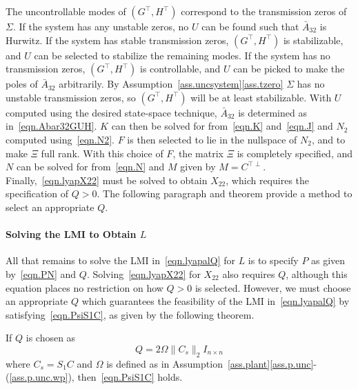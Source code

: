\documentclass[]{../sty/aiaa-tc}
\begin{document}
  The uncontrollable modes of $(G^{\top},H^{\top})$ correspond to the transmission zeros of $\Sigma$\cite{kouvaritakis.part2.1976}.
  If the system has any unstable zeros, no $U$ can be found such that $\bar{A}_{32}$ is Hurwitz.
  If the system has stable transmission zeros, $(G^{\top},H^{\top})$ is stabilizable, and $U$ can be selected to stabilize the remaining modes.
  If the system has no transmission zeros, $(G^{\top},H^{\top})$ is controllable, and $U$ can be picked to make the poles of $\bar{A}_{32}$ arbitrarily.
  By Assumption~\ref{ass.uncsystem}\ref{ass.tzero} $\Sigma$ has no unstable transmission zeros, so $(G^{\top},H^{\top})$ will be at least stabilizable.
  With $U$ computed using the desired state-space technique, $\bar{A}_{32}$ is determined as in\ \eqref{eqn.Abar32GUH}.
  $K$ can then be solved for from\ \eqref{eqn.K} and\ \eqref{eqn.J} and $N_{2}$ computed using\ \eqref{eqn.N2}.
  $F$ is then selected to lie in the nullspace of $N_{2}$, and to make $\Xi$ full rank.
  With this choice of $F$, the matrix $\Xi$ is completely specified, and $N$ can be solved for from\ \eqref{eqn.N} and $M$ given by $M=C^{\top\perp}$.
  Finally,\ \eqref{eqn.lyapX22} must be solved to obtain $X_{22}$, which requires the specification of $Q>0$.
  The following paragraph and theorem provide a method to select an appropriate $Q$.

  \paragraph{Solving the LMI to Obtain $L$}

  All that remains to solve the LMI in\ \eqref{eqn.lyapalQ} for $L$ is to specify $P$ as given by\ \eqref{eqn.PN} and $Q$.
  Solving\ \eqref{eqn.lyapX22} for $X_{22}$ also requires $Q$, although this equation places no restriction on how $Q>0$ is selected.
  However, we must choose an appropriate $Q$ which guarantees the feasibility of the LMI in\ \eqref{eqn.lyapalQ} by satisfying\ \eqref{eqn.PsiS1C}, as given by the following theorem.

  \begin{thm-dan}
    If $Q$ is chosen as
    \begin{equation}
      \label{eqn.Q}
      Q=2\Omega\|C_{s}\|_{2}I_{n\times n}
    \end{equation}
    where $C_{s}=S_{1}C$ and $\Omega$ is defined as in Assumption~\ref{ass.plant}\ref{ass.p.unc}-(\ref{ass.p.unc.wp}), then\ \eqref{eqn.PsiS1C} holds.
  \end{thm-dan}
\end{document}
